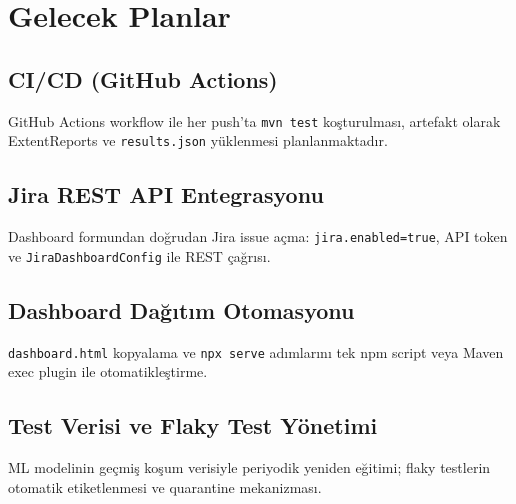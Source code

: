 \chapter{Gelecek Planlar}

\section{CI/CD (GitHub Actions)}
GitHub Actions workflow ile her push'ta \texttt{mvn test} koşturulması, artefakt olarak ExtentReports ve \texttt{results.json} yüklenmesi planlanmaktadır.

\section{Jira REST API Entegrasyonu}
Dashboard formundan doğrudan Jira issue açma: \texttt{jira.enabled=true}, API token ve \texttt{JiraDashboardConfig} ile REST çağrısı.

\section{Dashboard Dağıtım Otomasyonu}
\texttt{dashboard.html} kopyalama ve \texttt{npx serve} adımlarını tek npm script veya Maven exec plugin ile otomatikleştirme.

\section{Test Verisi ve Flaky Test Yönetimi}
ML modelinin geçmiş koşum verisiyle periyodik yeniden eğitimi; flaky testlerin otomatik etiketlenmesi ve quarantine mekanizması.

